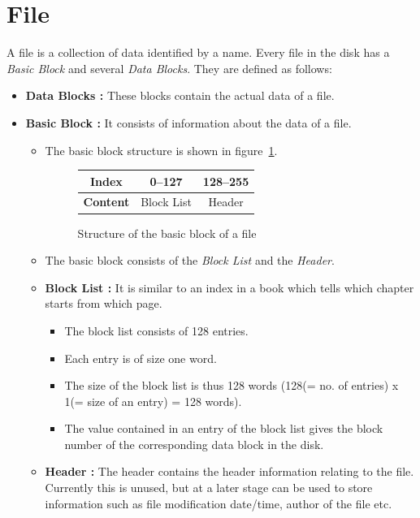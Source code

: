 \section{File}
A file  is a collection of data identified by a name. Every file in the disk has a \textit{Basic Block} and several \textit{Data Blocks}. They are defined as follows:
\begin{itemize}
	\item \textbf{Data Blocks :}  These blocks contain the actual data of a file. 
	\item \textbf{Basic Block :}  It consists of information about the data of a file. 
	\begin{itemize}
		\item The basic block structure is shown in figure~\ref{fig:basic block}. 
		\begin{figure}[h]
			\centering
			\begin{tabular}{|c|c|c|}
				\hline
				\textbf{Index} & 0--127 & 128--255\\
				\hline
				\textbf{Content} & Block List & Header\\
				\hline
			\end{tabular}
			\caption{Structure of the basic block of a file}
			\label{fig:basic block}
		\end{figure}
		\item The basic block consists of the \textit{Block List} and the \textit{Header}.
		\item \textbf{Block List :} It is similar to an index in a book which tells which chapter starts from which page.
		\begin{itemize}
			\item The block list consists of 128 entries.
			\item Each entry is of size one word.
			\item The size of the block list is thus 128 words (128(= no. of entries) x 1(= size of an entry) = 128 words).
			\item The value contained in an entry of the block list gives the block number of the corresponding data block in the disk.
		\end{itemize}
		\item \textbf{Header :} The header contains the header information relating to the file. Currently this is unused, but at a later stage can be used to store information such as file modification date/time, author of the file etc.
	\end{itemize}
\end{itemize}

